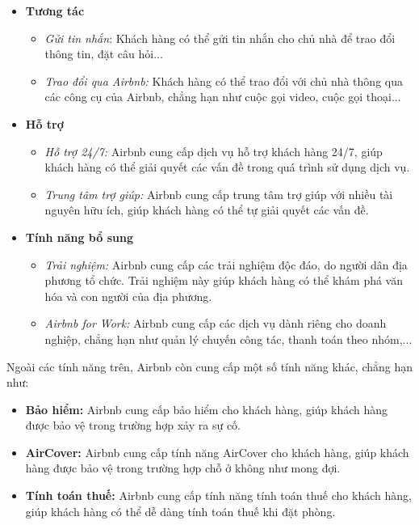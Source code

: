 \begin{itemize}
\begin{itemize}
    \end{itemize}
    \item \textbf{Tương tác}
    \begin{itemize}
        \item \textit{Gửi tin nhắn}: Khách hàng có thể gửi tin nhắn cho chủ nhà để trao đổi thông tin, đặt câu hỏi...
        \item \textit{Trao đổi qua Airbnb:} Khách hàng có thể trao đổi với chủ nhà thông qua các công cụ của Airbnb, chẳng hạn như cuộc gọi video, cuộc gọi thoại...
    \end{itemize}
    \item \textbf{Hỗ trợ}
    \begin{itemize}
        \item \textit{Hỗ trợ 24/7:} Airbnb cung cấp dịch vụ hỗ trợ khách hàng 24/7, giúp khách hàng có thể giải quyết các vấn đề trong quá trình sử dụng dịch vụ.
        \item \textit{Trung tâm trợ giúp:} Airbnb cung cấp trung tâm trợ giúp với nhiều tài nguyên hữu ích, giúp khách hàng có thể tự giải quyết các vấn đề.
    \end{itemize}
    \item \textbf{Tính năng bổ sung}
    \begin{itemize}
        \item \textit{Trải nghiệm:} Airbnb cung cấp các trải nghiệm độc đáo, do người dân địa phương tổ chức. Trải nghiệm này giúp khách hàng có thể khám phá văn hóa và con người của địa phương.
        \item \textit{Airbnb for Work:} Airbnb cung cấp các dịch vụ dành riêng cho doanh nghiệp, chẳng hạn như quản lý chuyến công tác, thanh toán theo nhóm,...
    \end{itemize}
\end{itemize}
Ngoài các tính năng trên, Airbnb còn cung cấp một số tính năng khác, chẳng hạn như:
\begin{itemize}
    \item \textbf{Bảo hiểm:} Airbnb cung cấp bảo hiểm cho khách hàng, giúp khách hàng được bảo vệ trong trường hợp xảy ra sự cố.
    \item \textbf{AirCover:} Airbnb cung cấp tính năng AirCover cho khách hàng, giúp khách hàng được bảo vệ trong trường hợp chỗ ở không như mong đợi.
    \item \textbf{Tính toán thuế:} Airbnb cung cấp tính năng tính toán thuế cho khách hàng, giúp khách hàng có thể dễ dàng tính toán thuế khi đặt phòng.
\end{itemize}

